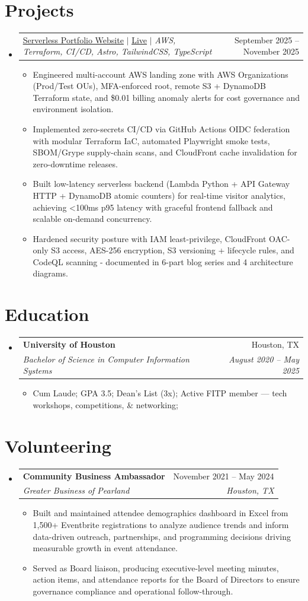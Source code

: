 \documentclass[letterpaper,11pt]{article}
\makeatletter
\newcommand{\resumeItem}[1]{
  \item\small{
    {#1 \vspace{-2pt}}
  }
}
\newcommand{\resumeSubheading}[4]{
  \vspace{-2pt}\item
    \begin{tabular*}{0.97\textwidth}[t]{l@{\extracolsep{\fill}}r}
      \textbf{#1} & #2 \\
      \textit{\small#3} & \textit{\small #4} \\
    \end{tabular*}\vspace{-7pt}
}
\newcommand{\resumeProjectHeading}[2]{
    \item
    \begin{tabular*}{0.97\textwidth}{l@{\extracolsep{\fill}}r}
      \small#1 & #2 \\
    \end{tabular*}\vspace{-7pt}
}
\newcommand{\resumeSubHeadingListStart}{\begin{itemize}[leftmargin=0.15in, label={}]}
\newcommand{\resumeSubHeadingListEnd}{\end{itemize}}
\newcommand{\resumeItemListStart}{\begin{itemize}}
\newcommand{\resumeItemListEnd}{\end{itemize}\vspace{-5pt}}
\makeatother
\begin{document}
\section{Projects}
\resumeSubHeadingListStart
  \resumeProjectHeading
      {\href{https://github.com/tlklein/portfolio-website}{\underline{Serverless Portfolio Website}} $|$ \href{https://trinityklein.dev/}{\underline{Live}} $|$ \emph{AWS, Terraform, CI/CD, Astro, TailwindCSS, TypeScript}}{September 2025 -- November 2025}
      \resumeItemListStart
        \resumeItem{Engineered multi-account AWS landing zone with AWS Organizations (Prod/Test OUs), MFA-enforced root, remote S3 + DynamoDB Terraform state, and \$0.01 billing anomaly alerts for cost governance and environment isolation.}
        \resumeItem{Implemented zero-secrets CI/CD via GitHub Actions OIDC federation with modular Terraform IaC, automated Playwright smoke tests, SBOM/Grype supply-chain scans, and CloudFront cache invalidation for zero-downtime releases.}
        \resumeItem{Built low-latency serverless backend (Lambda Python + API Gateway HTTP + DynamoDB atomic counters) for real-time visitor analytics, achieving <100ms p95 latency with graceful frontend fallback and scalable on-demand concurrency.}
        \resumeItem{Hardened security posture with IAM least-privilege, CloudFront OAC-only S3 access, AES-256 encryption, S3 versioning + lifecycle rules, and CodeQL scanning - documented in 6-part blog series and 4 architecture diagrams.}
      \resumeItemListEnd
\resumeSubHeadingListEnd

\section{Education}
\resumeSubHeadingListStart
  \resumeSubheading
    {University of Houston}{Houston, TX}
    {Bachelor of Science in Computer Information Systems}{August 2020 -- May 2025}
    \resumeItemListStart
      \resumeItem{Cum Laude; GPA 3.5; Dean's List (3x); Active FITP member — tech workshops, competitions, \& networking;}
    \resumeItemListEnd
\resumeSubHeadingListEnd

\section{Volunteering}
  \resumeSubHeadingListStart
    \resumeSubheading
      {Community Business Ambassador}{November 2021 -- May 2024}
      {Greater Business of Pearland}{Houston, TX}
      \resumeItemListStart
        \resumeItem{Built and maintained attendee demographics dashboard in Excel from 1,500+ Eventbrite registrations to analyze audience trends and inform data-driven outreach, partnerships, and programming decisions driving measurable growth in event attendance.}
        \resumeItem{Served as Board liaison, producing executive-level meeting minutes, action items, and attendance reports for the Board of Directors to ensure governance compliance and operational follow-through.}
      \resumeItemListEnd
  \resumeSubHeadingListEnd

\end{document}
